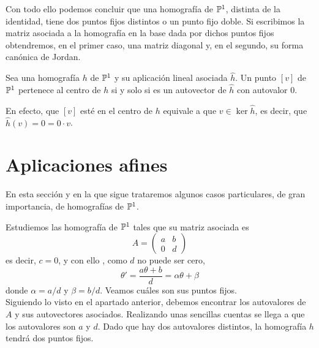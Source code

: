 Con todo ello podemos concluir que una homografía de $\mathbb{P}^1$, distinta de la identidad, tiene dos puntos fijos distintos o un punto fijo doble. Si escribimos la matriz asociada a la homografía en la base dada por dichos puntos fijos obtendremos, en el primer caso, una matriz diagonal y, en el segundo, su forma canónica de Jordan. 
\begin{obs}
	Sea una homografía $h$ de $\mathbb{P}^1$ y su aplicación lineal asociada $\widehat{h}$. Un punto $[v]$ de $\mathbb{P}^1$ pertenece al centro de $h$ si y solo si es un autovector de $\widehat{h}$ con autovalor $0$.
	
	En efecto, que $[v]$ esté en el centro de $h$ equivale a que $v\in \ker\widehat{h}$, es decir, que $\widehat{h}(v)=0=0\cdot v$.
\end{obs}

\section{Aplicaciones afines}
En esta sección y en la que sigue trataremos algunos casos particulares, de gran importancia, de homografías de $\mathbb{P}^1$.

Estudiemos las homografía de $\mathbb{P}^1$ tales que su matriz asociada es
\begin{equation*}
	A=\left( \begin{array}{cc}
		a&b\\
		0&d
	\end{array}\right)
\end{equation*}
es decir, $c=0$, y con ello , como $d$ no puede ser cero, 
\begin{equation}
	\theta'=\frac{a\theta+b}{d}=\alpha\theta+\beta
\end{equation}
donde $\alpha=a/d$ y $\beta=b/d$. Veamos cuáles son sus puntos fijos.\\

Siguiendo lo visto en el apartado anterior, debemos encontrar los autovalores de $A$ y sus autovectores asociados. Realizando unas sencillas cuentas se llega a que los autovalores son $a$ y $d$. Dado que hay dos autovalores distintos, la homografía $h$ tendrá dos puntos fijos. 


